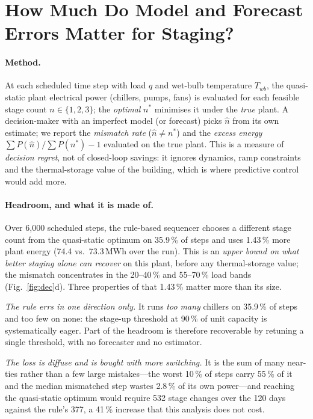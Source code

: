 \documentclass{svproc}
\begin{document}
\section{How Much Do Model and Forecast Errors Matter for Staging?}\label{sec:decision}
\paragraph{Method.} At each scheduled time step with load $q$ and wet-bulb temperature $T_{wb}$, the quasi-static plant electrical power (chillers, pumps, fans) is evaluated for each feasible stage count $n\in\{1,2,3\}$; the \emph{optimal} $n^\ast$ minimises it under the \emph{true} plant. A decision-maker with an imperfect model (or forecast) picks $\hat n$ from its own estimate; we report the \emph{mismatch rate} ($\hat n\neq n^\ast$) and the \emph{excess energy} $\sum P(\hat n)/\sum P(n^\ast)-1$ evaluated on the true plant. This is a measure of \emph{decision regret}, not of closed-loop savings: it ignores dynamics, ramp constraints and the thermal-storage value of the building, which is where predictive control would add more.

\paragraph{Headroom, and what it is made of.} Over 6{,}000 scheduled steps, the rule-based sequencer chooses a different stage count from the quasi-static optimum on 35.9\,\% of steps and uses 1.43\,\% more plant energy (74.4 vs.\ 73.3\,MWh over the run). This is an \emph{upper bound on what better staging alone can recover} on this plant, before any thermal-storage value; the mismatch concentrates in the 20--40\,\% and 55--70\,\% load bands (Fig.~\ref{fig:dec}d). Three properties of that 1.43\,\% matter more than its size.

\emph{The rule errs in one direction only.} It runs \emph{too many} chillers on 35.9\,\% of steps and too few on none: the stage-up threshold at 90\,\% of unit capacity is systematically eager. Part of the headroom is therefore recoverable by retuning a single threshold, with no forecaster and no estimator.

\emph{The loss is diffuse and is bought with more switching.} It is the sum of many near-ties rather than a few large mistakes---the worst 10\,\% of steps carry 55\,\% of it and the median mismatched step wastes 2.8\,\% of its own power---and reaching the quasi-static optimum would require 532 stage changes over the 120 days against the rule's 377, a 41\,\% increase that this analysis does not cost.
\end{document}
